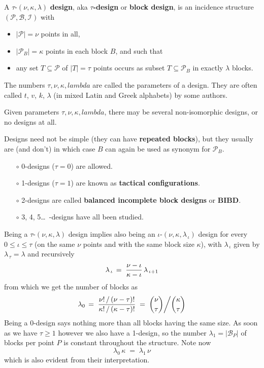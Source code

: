 \documentclass[12pt]{article}
\begin{document}
A $\tau$-$(\nu,\kappa,\lambda)$ {\bf design}, aka $\tau${\bf-design} or {\bf block design}, is an incidence structure $(\mathcal{P},\mathcal{B},\mathcal{I})$ with
\begin{itemize}
      \item $|\mathcal{P}| = \nu$ points in all,
      \item $|\mathcal{P}_B| = \kappa$ points in each block $B$, and such that
      \item any set $T\subseteq \mathcal{P}$ of $|T|=\tau$ points occurs as
            subset $T\subseteq \mathcal{P}_B$ in exactly $\lambda$ blocks.
\end{itemize}
The numbers $\tau,\nu,\kappa,lambda$ are called the parameters of a design.  They are often called $t$, $v$, $k$, $\lambda$ (in mixed Latin and Greek alphabets) by some authors.

Given parameters $\tau,\nu,\kappa,lambda$, there may be several non-isomorphic designs, or no designs at all.

Designs need not be simple (they can have {\bf repeated blocks}), but they usually are (and don't) in which case $B$ can again be used as synonym for $\mathcal{P}_B$.
%
\begin{itemize}
\item[$\circ$] 0-designs ($\tau=0$) are allowed.
\item[$\circ$] 1-designs ($\tau=1$) are known as {\bf tactical configurations}.
\item[$\circ$] 2-designs are called {\bf balanced incomplete block designs} or {\bf BIBD}.
\item[$\circ$] 3, 4, 5\dots\ -designs have all been studied.
\end{itemize}
%
Being a $\tau$-$(\nu,\kappa,\lambda)$ design implies also being an $\iota$-$(\nu,\kappa,\lambda_{\,\iota})$ design for every $0\le\iota\le\tau$ (on the same $\nu$ points and with the same block size $\kappa$), with $\lambda_{\,\iota}$ given by $\lambda_{\,\tau}=\lambda$ and recursively
$$
  \lambda_{\,\iota} \,=\; {\nu-\iota \over \kappa-\iota} \,\lambda_{\,\iota+1}
$$
from which we get the number of blocks as
$$
  \lambda_0 \,=\; {\nu!\,/\,(\nu-\tau)! \over \kappa!\,/\,(\kappa-\tau)!}
            \;=\; {\nu\choose\tau} \bigg/ {\kappa\choose\tau}
$$
Being a 0-design says nothing more than all blocks having the same size. As soon as we have $\tau\ge1$ however we also have a 1-design, so the number $\lambda_1 = |\mathcal{B}_P|$ of blocks per point $P$ is constant throughout the structure.  Note now
$$
  \lambda_0\,\kappa \;=\; \lambda_1\,\nu
$$
which is also evident from their interpretation.
\end{document}
